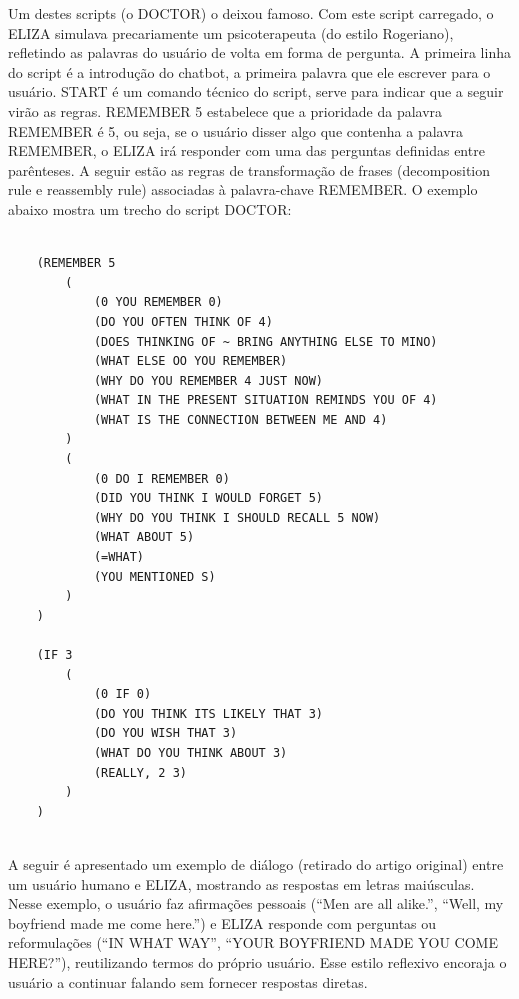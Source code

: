 \documentclass[14pt,a4paper,oneside]{book}
\begin{document}
Um destes scripts (o DOCTOR) o deixou famoso. 
Com este script carregado, o ELIZA simulava precariamente um psicoterapeuta (do estilo Rogeriano), refletindo as palavras do usuário de volta em forma de pergunta. 
A primeira linha do script é a introdução do chatbot, a primeira palavra que ele escrever para o usuário. 
START é um comando técnico do script, serve para indicar que a seguir virão as regras. REMEMBER 5 estabelece que a prioridade da palavra REMEMBER é 5, ou seja, se o usuário disser algo que contenha a palavra REMEMBER, o ELIZA irá responder com uma das perguntas definidas entre parênteses. 
A seguir estão as regras de transformação de frases (decomposition rule e reassembly rule) associadas à palavra-chave REMEMBER. O exemplo abaixo mostra um trecho do script DOCTOR:

\begin{verbatim}
		
	(REMEMBER 5 
		(
			(0 YOU REMEMBER 0) 
			(DO YOU OFTEN THINK OF 4) 
			(DOES THINKING OF ~ BRING ANYTHING ELSE TO MINO) 
			(WHAT ELSE OO YOU REMEMBER)
			(WHY DO YOU REMEMBER 4 JUST NOW) 
			(WHAT IN THE PRESENT SITUATION REMINDS YOU OF 4) 
			(WHAT IS THE CONNECTION BETWEEN ME AND 4)
		) 
		(
			(0 DO I REMEMBER 0) 
			(DID YOU THINK I WOULD FORGET 5) 
			(WHY DO YOU THINK I SHOULD RECALL 5 NOW) 
			(WHAT ABOUT 5) 
			(=WHAT) 
			(YOU MENTIONED S)
		) 
	) 
	
	(IF 3 
		(
			(0 IF 0) 
			(DO YOU THINK ITS LIKELY THAT 3) 
			(DO YOU WISH THAT 3) 
			(WHAT DO YOU THINK ABOUT 3) 
			(REALLY, 2 3)
		)
	) 
	

\end{verbatim}


A seguir é apresentado um exemplo de diálogo (retirado do artigo original) entre um usuário humano e ELIZA, mostrando as respostas em letras maiúsculas. Nesse exemplo, o usuário faz afirmações pessoais (“Men are all alike.”, “Well, my boyfriend made me come here.”) e ELIZA responde com perguntas ou reformulações (“IN WHAT WAY”, “YOUR BOYFRIEND MADE YOU COME HERE?”), reutilizando termos do próprio usuário. Esse estilo reflexivo encoraja o usuário a continuar falando sem fornecer respostas diretas.
\end{document}
